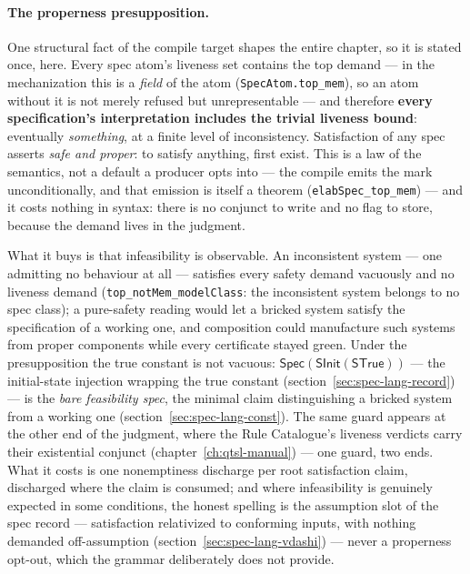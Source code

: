\paragraph{The properness presupposition.} One structural fact of the
compile target shapes the entire chapter, so it is stated once, here.
Every spec atom's liveness set contains the top demand --- in the
mechanization this is a \emph{field} of the atom
(\texttt{SpecAtom.top\_mem}), so an atom without it is not merely
refused but unrepresentable --- and therefore \textbf{every
specification's interpretation includes the trivial liveness bound}:
eventually \emph{something}, at a finite level of inconsistency.
Satisfaction of any
spec asserts \emph{safe and proper}: to satisfy anything, first
exist. This is a law of the semantics, not a default a producer
opts into --- the compile emits the mark unconditionally, and that
emission is itself a theorem
(\texttt{elabSpec\_top\_mem}) --- and it costs nothing in syntax:
there is no conjunct to write and no flag to store, because the
demand lives in the judgment.

What it buys is that infeasibility is observable. An inconsistent
system --- one admitting no behaviour at all --- satisfies every
safety demand vacuously and no liveness demand
(\texttt{top\_notMem\_modelClass}: the inconsistent system belongs to
no spec class); a pure-safety reading would let a bricked system
satisfy the specification of a working one, and composition could
manufacture such systems from proper components while every
certificate stayed green. Under the presupposition the true constant
is not vacuous: $\mathsf{Spec}(\mathsf{SInit}(\mathsf{STrue}))$ ---
the initial-state injection wrapping the true constant
(section~\ref{sec:spec-lang-record}) --- is the \emph{bare
feasibility spec}, the minimal claim distinguishing a bricked system
from a working one (section~\ref{sec:spec-lang-const}). The same
guard appears at the other end of the judgment, where the Rule
Catalogue's liveness verdicts carry their existential conjunct
(chapter~\ref{ch:qtsl-manual}) --- one guard, two ends. What it costs
is one nonemptiness discharge per root satisfaction claim, discharged
where the claim is consumed; and where infeasibility is genuinely
expected in some conditions, the honest spelling is the assumption
slot of the spec record --- satisfaction relativized to conforming
inputs, with nothing demanded off-assumption
(section~\ref{sec:spec-lang-vdashi}) --- never a properness opt-out,
which the grammar deliberately does not provide.

